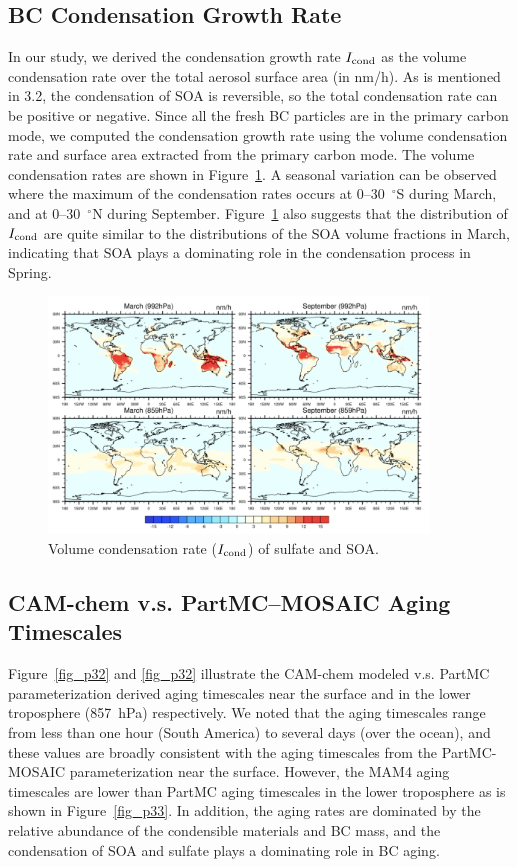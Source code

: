 \documentclass[12pt, fullpage]{uiucthesis2009}
\begin{document}
	\subsection{BC Condensation Growth Rate}		
	In our study, we derived the condensation growth rate $I_{\rm cond}$ as the volume condensation rate over the total aerosol surface area (in nm/h). As is mentioned in 3.2, the condensation of SOA is reversible, so the total condensation rate can be positive or negative. Since all the fresh BC particles are in the primary carbon mode, we computed the condensation growth rate using the volume condensation rate and surface area extracted from the primary carbon mode. The volume condensation rates are shown in Figure~\ref{fig_p24}. A seasonal variation can be observed where the maximum of the condensation rates occurs at 0--30~$^\circ$S during March, and at 0--30~$^\circ$N during September. Figure~\ref{fig_p24} also suggests that the distribution of $I_{\rm cond}$ are quite similar to the distributions of the SOA volume fractions in March, indicating that SOA plays a dominating role in the condensation process in Spring. 
	\begin{figure}[h] 
		\begin{center}
			\includegraphics[width = 0.9\textwidth]{Figure24}
			\caption[Volume condensation rate ($I_{\rm cond}$) of sulfate and SOA]{\label{fig_p24} Volume condensation rate ($I_{\rm cond}$) of sulfate and SOA.}
		\end{center}
	\end{figure}
	
		
	\subsection{CAM-chem v.s. PartMC--MOSAIC Aging Timescales}
	Figure~\ref{fig_p32} and \ref{fig_p32} illustrate the CAM-chem modeled v.s. PartMC parameterization derived aging timescales near the surface and in the lower troposphere (857~hPa) respectively. We noted that the aging timescales range from less than one hour (South America) to several days (over the ocean), and these values are broadly consistent with the aging timescales from the PartMC-MOSAIC parameterization near the surface. However, the MAM4 aging timescales are lower than PartMC aging timescales in the lower troposphere as is shown in Figure~\ref{fig_p33}. In addition, the aging rates are dominated by the relative abundance of the condensible materials and BC mass, and the condensation of SOA and sulfate plays a dominating role in BC aging.
	
\end{document}
